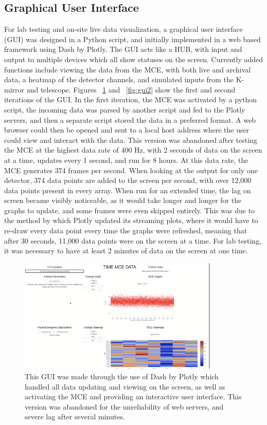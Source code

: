 \documentclass[manuscript]{aastex}
\begin{document}
\subsection{Graphical User Interface}
For lab testing and on-site live data visualization, a graphical user interface (GUI) was designed in a {\sc Python} script, and initially implemented in a web based framework using {\sc Dash by Plotly}. The GUI acts like a HUB, with input and output to multiple devices which all show statuses on the screen. Currently added functions include viewing the data from the MCE, with both live and archival data, a heatmap of the detector channels, and simulated inputs from the K-mirror and telescope. Figures ~\ref{fig:gui1} and ~\ref{fig:gui2} show the first and second iterations of the GUI. In the first iteration, the MCE was activated by a python script, the incoming data was parsed by another script and fed to the Plotly servers, and then a separate script stored the data in a preferred format. A web browser could then be opened and sent to a local host address where the user could view and interact with the data. This version was abandoned after testing the MCE at the highest data rate of 400 Hz, with 2 seconds of data on the screen at a time, updates every 1 second, and run for 8 hours. At this data rate, the MCE generates 374 frames per second. When looking at the output for only one detector, 374 data points are added to the screen per second, with over 12,000 data points present in every array. When run for an extended time, the lag on screen became visibly noticeable, as it would take longer and longer for the graphs to update, and some frames were even skipped entirely. This was due to the method by which Plotly updated its streaming plots, where it would have to re-draw every data point every time the graphs were refreshed, meaning that after 30 seconds, 11,000 data points were on the screen at a time. For lab testing, it was necessary to have at least 2 minutes of data on the screen at one time.

\begin{figure}[H]
	\centering
	\captionsetup{width=0.85\textwidth}
	\includegraphics[width=0.85\textwidth]{gui1.png}%
	\caption[GUI Beta 1.0]{This GUI was made through the use of {\sc Dash by Plotly} which handled all data updating and viewing on the screen, as well as activating the MCE and providing an interactive user interface. This version was abandoned for the unreliability of web servers, and severe lag after several minutes.}%
	\label{fig:gui1}%
\end{figure}
\end{document}
